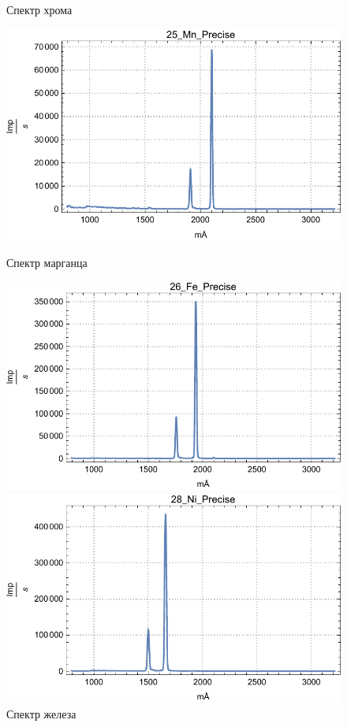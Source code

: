 \documentclass[a4paper, 12pt]{article}
\begin{document}
\begin{enumerate}
\begin{figure}[!htb]
		\caption{Спектр хрома}
		\endminipage\hfill
		\includegraphics[width=\linewidth]{PhysLab5/25_Mn_Precise.pdf}
		\caption{Спектр марганца}
		\endminipage\hfill
		\includegraphics[width=\linewidth]{PhysLab5/26_Fe_Precise.pdf}
		\caption{Спектр железа}
		\endminipage\hfill
		\includegraphics[width=\linewidth]{PhysLab5/28_Ni_Precise.pdf}

\end{figure}
\end{enumerate}
\end{document}
